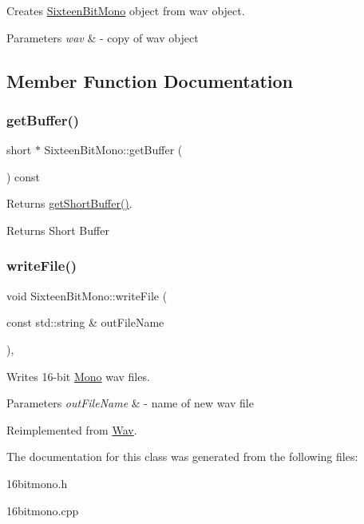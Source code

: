 Creates \hyperlink{classSixteenBitMono}{Sixteen\+Bit\+Mono} object from wav object.


\begin{DoxyParams}{Parameters}
{\em wav} & -\/ copy of wav object \\
\hline
\end{DoxyParams}


\subsection{Member Function Documentation}
\mbox{\label{classSixteenBitMono_ae5ac457f6ab42ee169800d890b676415}} 
\subsubsection{\texorpdfstring{get\+Buffer()}{getBuffer()}}
{\footnotesize\ttfamily short $\ast$ Sixteen\+Bit\+Mono\+::get\+Buffer (\begin{DoxyParamCaption}{ }\end{DoxyParamCaption}) const}

Returns \hyperlink{classWav_a24c23c9823a08c0ff1a2a39427b36135}{get\+Short\+Buffer()}. \begin{DoxyReturn}{Returns}
Short Buffer 
\end{DoxyReturn}
\mbox{\label{classSixteenBitMono_a331ba2f00ff9614c1c0dc99ad6fb55f6}} 
\subsubsection{\texorpdfstring{write\+File()}{writeFile()}}
{\footnotesize\ttfamily void Sixteen\+Bit\+Mono\+::write\+File (\begin{DoxyParamCaption}\item[{const std\+::string \&}]{out\+File\+Name }\end{DoxyParamCaption})\hspace{0.3cm}{\ttfamily [override]}, {\ttfamily [virtual]}}

Writes 16-\/bit \hyperlink{classMono}{Mono} wav files.


\begin{DoxyParams}{Parameters}
{\em out\+File\+Name} & -\/ name of new wav file \\
\hline
\end{DoxyParams}


Reimplemented from \hyperlink{classWav_a7bae34f37288c53cb113e76045f78098}{Wav}.



The documentation for this class was generated from the following files\+:\begin{DoxyCompactItemize}
\item 
16bitmono.\+h\item 
16bitmono.\+cpp\end{DoxyCompactItemize}
